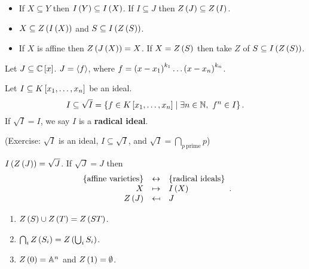 \begin{proposition}
\hfill
\begin{itemize}
\item If $ X \subseteq Y $ then $ I\rb{Y} \subseteq I\rb{X} $. If $ I \subseteq J $ then $ Z\rb{J} \subseteq Z\rb{I} $.
\item $ X \subseteq Z\rb{I\rb{X}} $ and $ S \subseteq I\rb{Z\rb{S}} $.
\item If $ X $ is affine then $ Z\rb{J\rb{X}} = X $. If $ X = Z\rb{S} $ then take $ Z $ of $ S \subseteq I\rb{Z\rb{S}} $.
\end{itemize}
\end{proposition}

\begin{example1}
Let $ J \subseteq \C\sb{x} $. $ J = \ab{f} $, where $ f = \rb{x - x_1}^{k_1} \dots \rb{x - x_n}^{k_n} $.
\end{example1}

\begin{definition}
Let $ I \subseteq K\sb{x_1, \dots, x_n} $ be an ideal.
$$ I \subseteq \sqrt{I} = \cb{f \in K\sb{x_1, \dots, x_n} \mid \exists n \in \N, \ f^n \in I}. $$
If $ \sqrt{I} = I $, we say $ I $ is a \textbf{radical ideal}.
\end{definition}

(Exercise: $ \sqrt{I} $ is an ideal, $ I \subseteq \sqrt{I} $, and $ \sqrt{I} = \bigcap_{p \ \text{prime}} p $)

\begin{theorem}
$ I\rb{Z\rb{J}} = \sqrt{J} $. If $ \sqrt{J} = J $ then
$$
\begin{array}{rcl}
\cb{\text{affine varieties}} & \leftrightarrow & \cb{\text{radical ideals}} \\
X & \mapsto & I\rb{X} \\
Z\rb{J} & \mapsfrom & J
\end{array}.
$$
\end{theorem}


\begin{proposition}
\hfill
\begin{enumerate}
\item $ Z\rb{S} \cup Z\rb{T} = Z\rb{ST} $.
\item $ \bigcap_i Z\rb{S_i} = Z\rb{\bigcup_i S_i} $.
\item $ Z\rb{0} = \A^n $ and $ Z\rb{1} = \emptyset $.
\end{enumerate}
\end{proposition}

